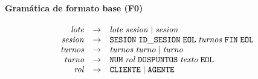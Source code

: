 
\paragraph{Gramática de formato base (F0)}
\[
\begin{array}{rcl}
  \mathit{lote} & \to & \mathit{lote}\;\mathit{sesion} \mid \mathit{sesion} \\
  \mathit{sesion} & \to & \mathtt{SESION}\;\mathtt{ID\_SESION}\;\mathtt{EOL}\;\mathit{turnos}\;\mathtt{FIN}\;\mathtt{EOL} \\
  \mathit{turnos} & \to & \mathit{turnos}\;\mathit{turno} \mid \mathit{turno} \\
  \mathit{turno} & \to & \mathtt{NUM}\;\mathit{rol}\;\mathtt{DOSPUNTOS}\;\mathit{texto}\;\mathtt{EOL} \\
  \mathit{rol} & \to & \mathtt{CLIENTE} \mid \mathtt{AGENTE} \\
\end{array}
\]

